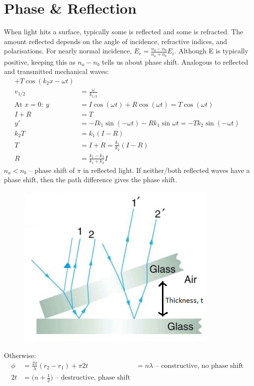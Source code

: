\documentclass[a4paper, 11pt, normalem]{report}
\begin{document}
\section{Phase \& Reflection}
When light hits a surface, typically some is reflected and some is refracted. 
The amount reflected depends on the angle of incidence, refractive indices, and polarisations.
For nearly normal incidence, $E_{r} = \frac{n_{a} - n_{b}}{n_{a} + n_{b}}E_{i}$.
Although E is typically positive, keeping this as $n_{a} - n_{b}$ tells us about phase shift.
Analogous to reflected and transmitted mechanical waves:
\begin{align}
    [I\cos{(k_{1}x - \omega t)} &+ R\cos{(k_{1}x - \omega t)}] + T\cos{(k_{2}x - \omega t)} \\
    v_{1/2} &= \frac{\omega}{k_{1/2}} \\
    \text{At }x = 0:~y &= I\cos{(\omega t)} + R\cos{(\omega t)} = T\cos{(\omega t)} \\
    I + R &= T \\
    y' &= -Ik_{1}\sin{(-\omega t)} - Rk_{1}\sin{\omega t} = -Tk_{2}\sin{(-\omega t)} \\
    k_{2}T &= k_{1}(I - R) \\
    T &= I + R = \frac{k_{1}}{k_{2}}(I - R) \\
    R &= \frac{k_{1} - k_{2}}{k_{1} + k_{2}}I
\end{align}
$n_{a} < n_{b}$ -- phase shift of $\pi$ in reflected light.
If neither/both reflected waves have a phase shift, then the path difference gives the phase shift. 
\begin{figure}[H]
    \centering
    \includegraphics[scale=0.8]{Thickness.jpg} 
\end{figure}
Otherwise:
\begin{align}
    \phi &= \frac{2\pi}{\lambda}(r_{2} - r_{1}) + \pi
    2t &= n\lambda \text{ -- constructive, no phase shift} \\
    2t &= \Big(n + \frac{1}{2}\Big)\text{ -- destructive, phase shift}
\end{align}
\end{document}
